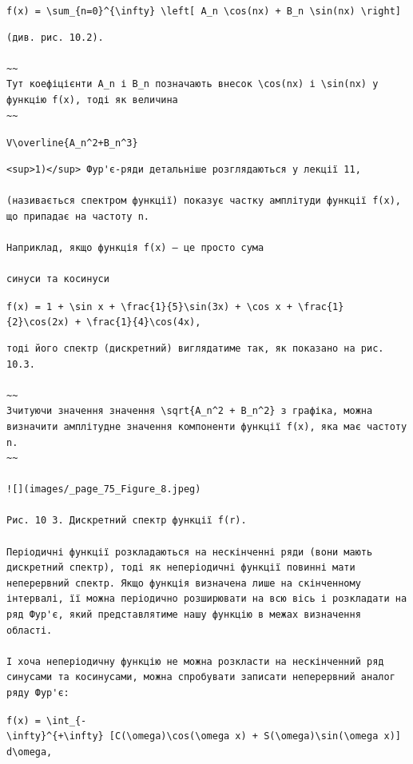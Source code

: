 \documentclass[
  ukrainian,
]{article}
\begin{document}
\texttt{f(x)\ =\ \textbackslash{}sum\_\{n=0\}\^{}\{\textbackslash{}infty\}\ \textbackslash{}left{[}\ A\_n\ \textbackslash{}cos(nx)\ +\ B\_n\ \textbackslash{}sin(nx)\ \textbackslash{}right{]}}

\begin{verbatim}
(див. рис. 10.2).

~~
Тут коефіцієнти A_n і B_n позначають внесок \cos(nx) і \sin(nx) у функцію f(x), тоді як величина
~~
\end{verbatim}

\texttt{V\textbackslash{}overline\{A\_n\^{}2+B\_n\^{}3\}}

\begin{verbatim}
<sup>1)</sup> Фур'є-ряди детальніше розглядаються у лекції 11,

(називається спектром функції) показує частку амплітуди функції f(x), що припадає на частоту n.

Наприклад, якщо функція f(x) — це просто сума

синуси та косинуси
\end{verbatim}

\texttt{f(x)\ =\ 1\ +\ \textbackslash{}sin\ x\ +\ \textbackslash{}frac\{1\}\{5\}\textbackslash{}sin(3x)\ +\ \textbackslash{}cos\ x\ +\ \textbackslash{}frac\{1\}\{2\}\textbackslash{}cos(2x)\ +\ \textbackslash{}frac\{1\}\{4\}\textbackslash{}cos(4x),}

\begin{verbatim}
тоді його спектр (дискретний) виглядатиме так, як показано на рис. 10.3.

~~
Зчитуючи значення значення \sqrt{A_n^2 + B_n^2} з графіка, можна визначити амплітудне значення компоненти функції f(x), яка має частоту n.
~~

![](images/_page_75_Figure_8.jpeg)

Рис. 10 3. Дискретний спектр функції f(r).

Періодичні функції розкладаються на нескінченні ряди (вони мають дискретний спектр), тоді як неперіодичні функції повинні мати неперервний спектр. Якщо функція визначена лише на скінченному інтервалі, її можна періодично розширювати на всю вісь і розкладати на ряд Фур'є, який представлятиме нашу функцію в межах визначення області.

І хоча неперіодичну функцію не можна розкласти на нескінченний ряд синусами та косинусами, можна спробувати записати неперервний аналог ряду Фур'є:
\end{verbatim}

\texttt{f(x)\ =\ \textbackslash{}int\_\{-\textbackslash{}infty\}\^{}\{+\textbackslash{}infty\}\ {[}C(\textbackslash{}omega)\textbackslash{}cos(\textbackslash{}omega\ x)\ +\ S(\textbackslash{}omega)\textbackslash{}sin(\textbackslash{}omega\ x){]}\ d\textbackslash{}omega,}
\end{document}
